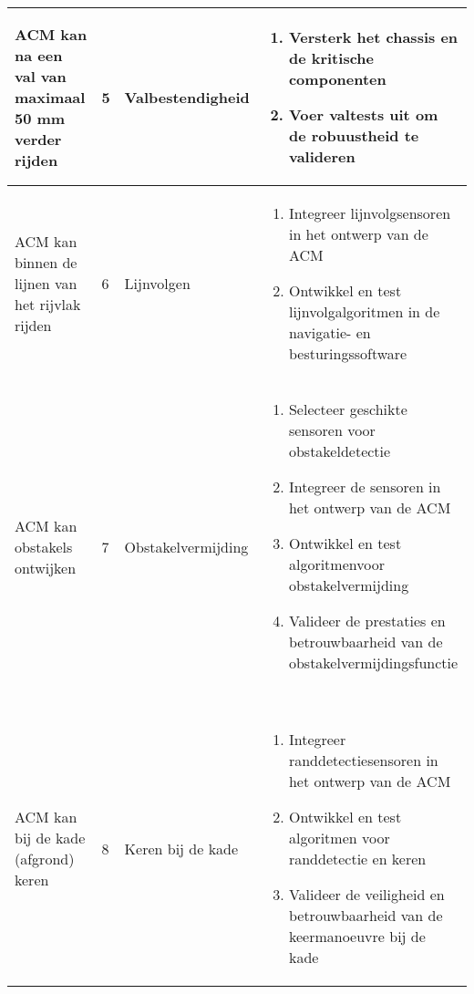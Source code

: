 \begin{longtable}{@{}p{4cm}p{2cm}p{3cm}p{5cm}@{}}
    ACM kan na een val van maximaal 50 mm verder rijden                                                    & 5            & Valbestendigheid              &
    \begin{enumerate}[nosep, leftmargin=*]
        \item Versterk het chassis en de kritische componenten
        \item Voer valtests uit om de robuustheid te valideren
    \end{enumerate}                                                                                                         \\
    \midrule

    ACM kan binnen de lijnen van het rijvlak rijden                                                        & 6            & Lijnvolgen                    &
    \begin{enumerate}[nosep, leftmargin=*]
        \item Integreer lijnvolgsensoren in het ontwerp van de ACM
        \item Ontwikkel en test lijnvolgalgoritmen in de navigatie- en besturingssoftware
    \end{enumerate}                                                                              \\
    \midrule

    ACM kan obstakels ontwijken                                                                            & 7            & Obstakelvermijding            &
    \begin{enumerate}[nosep, leftmargin=*]
        \item Selecteer geschikte sensoren voor obstakeldetectie
        \item Integreer de sensoren in het ontwerp van de ACM
        \item Ontwikkel en test algoritmenvoor obstakelvermijding \
        \item Valideer de prestaties en betrouwbaarheid van de obstakelvermijdingsfunctie \
    \end{enumerate}                                                                            \\
    \midrule

    ACM kan bij de kade (afgrond) keren                                                                    & 8            & Keren bij de kade             &
    \begin{enumerate}[nosep, leftmargin=*]
        \item Integreer randdetectiesensoren in het ontwerp van de ACM
        \item Ontwikkel en test algoritmen voor randdetectie en keren
        \item Valideer de veiligheid en betrouwbaarheid van de keermanoeuvre bij de kade \
    \end{enumerate}                                                                             \\
    \midrule


\end{longtable}
